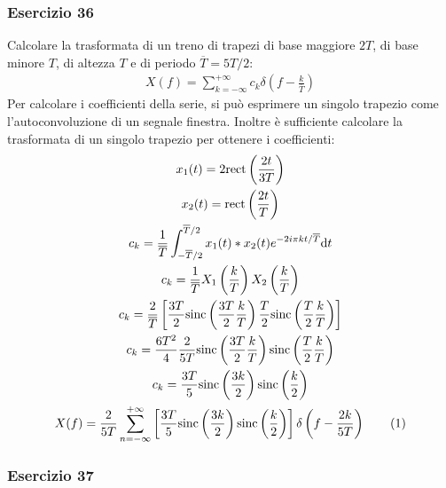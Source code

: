 \documentclass{article}
\newcommand{\rect}{\mathrm{rect}}
\newcommand{\sinc}{\mathrm{sinc}}
\newcommand{\df}{\mathrm{d}}
\newcommand{\tageq}{\tag{\stepcounter{equation}\theequation}}
\begin{document}
\subsubsection*{Esercizio 36}

Calcolare la trasformata di un treno di trapezi di base maggiore $2T$, di base minore $T$, di altezza $T$ e di periodo $\overline T=5T/2$:
\begin{gather*}
    X(f)=\displaystyle\sum_{k=-\infty}^{+\infty}c_k\delta\left(f-\frac{k}{\overline T}\right)
\end{gather*}
Per calcolare i coefficienti della serie, si può esprimere un singolo trapezio come l'autoconvoluzione di un segnale finestra. Inoltre è sufficiente calcolare la 
trasformata di un singolo trapezio per ottenere i coefficienti:
\begin{gather*}
    x_1(t)=2\displaystyle\rect\left(\frac{2t}{3T}\right)\\
    x_2(t)=\displaystyle\rect\left(\frac{2t}{T}\right)\\
    c_k=\displaystyle\frac{1}{\overline T}\int_{-\overline T/2}^{\overline T/2}x_1(t)*x_2(t)e^{-2i\pi kt/\overline T}\df t\\
    c_k=\displaystyle\frac{1}{\overline T}X_1\left(\frac{k}{ T}\right)X_2\left(\frac{k}{ T}\right)\\
    c_k=\displaystyle\frac{2}{\overline T}\left[\frac{3T}{2}\sinc\left(\frac{3T}{2}\frac{k}{ T}\right)\frac{T}{2}\sinc\left(\frac{T}{2}\frac{k}{ T}\right)\right]\\
    c_k=\displaystyle\frac{6T^2}{4}\frac{2}{5T}\sinc\left(\frac{3T}{2}\frac{k}{ T}\right)\sinc\left(\frac{T}{2}\frac{k}{ T}\right)\\
    c_k=\displaystyle\frac{3T}{5}\sinc\left(\frac{3k}{2}\right)\sinc\left(\frac{k}{2}\right)\\
    X(f)=\displaystyle\frac{2}{5T}\sum_{n=-\infty}^{+\infty}\left[\frac{3T}{5}\sinc\left(\frac{3k}{2}\right)\sinc\left(\frac{k}{2}\right)\right]\delta\left(f-\frac{2k}{5T}\right)\tageq
\end{gather*}

\subsubsection*{Esercizio 37}
\end{document}
